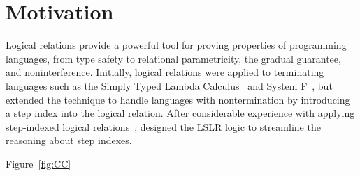 \documentclass[acmsmall]{acmart}
\begin{document}



\maketitle

\section{Motivation}

Logical relations provide a powerful tool for proving properties of
programming languages, from type safety to relational parametricity,
the gradual guarantee, and noninterference.  Initially, logical
relations were applied to terminating languages such as the Simply
Typed Lambda Calculus~\citep{Tait:1967aa} and System
F~\citep{GIRARD72}, but \citet{Appel:2001aa} extended the technique to
handle languages with nontermination by introducing a step index into
the logical relation. After considerable experience with applying
step-indexed logical
relations~\citep{Ahmed:2004eu,Ahmed:2009aa,Neis:2009fk,Hur:2011aa},
\citet{Dreyer:2011wl} designed the LSLR logic to streamline the
reasoning about step indexes.





Figure~\ref{fig:CC}
\end{document}
